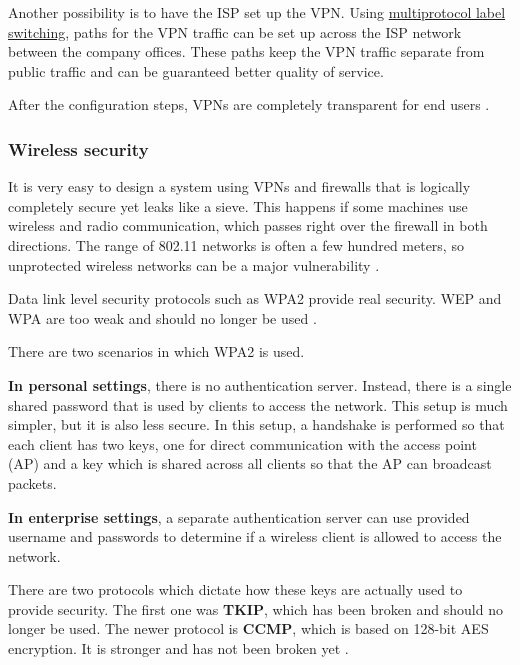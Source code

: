 Another possibility is to have the ISP set up the VPN. Using \href{https://en.wikipedia.org/wiki/Multiprotocol_Label_Switching}{multiprotocol label switching}, paths for the VPN traffic can be set up across the ISP network between the company offices. These paths keep the VPN traffic separate from public traffic and can be guaranteed better quality of service.

After the configuration steps, VPNs are completely transparent for end users \cite[p.~822]{computer-networks-tanenbaum-2012}.

\subsubsection{Wireless security}

It is very easy to design a system using VPNs and firewalls that is logically completely secure yet leaks like a sieve.
This happens if some machines use wireless and radio communication, which passes right over the firewall in both directions.
The range of 802.11 networks is often a few hundred meters, so unprotected wireless networks can be a major vulnerability \cite[p.~823]{computer-networks-tanenbaum-2012}.

Data link level security protocols such as WPA2 provide real security.
WEP and WPA are too weak and should no longer be used \cite[p.~824]{computer-networks-tanenbaum-2012}.

There are two scenarios in which WPA2 is used.

\textbf{In personal settings}, there is no authentication server. Instead, there is a single shared password that is used by clients to access the network. This setup is much simpler, but it is also less secure. In this setup, a handshake is performed so that each client has two keys, one for direct communication with the access point (AP) and a key which is shared across all clients so that the AP can broadcast packets.

\textbf{In enterprise settings}, a separate authentication server can use provided username and passwords to determine if a wireless client is allowed to access the network. 

There are two protocols which dictate how these keys are actually used to provide security.
The first one was \textbf{TKIP}, which has been broken and should no longer be used.
The newer protocol is \textbf{CCMP}, which is based on 128-bit AES encryption. It is stronger and has not been broken yet \cite[p.~825]{computer-networks-tanenbaum-2012}.

